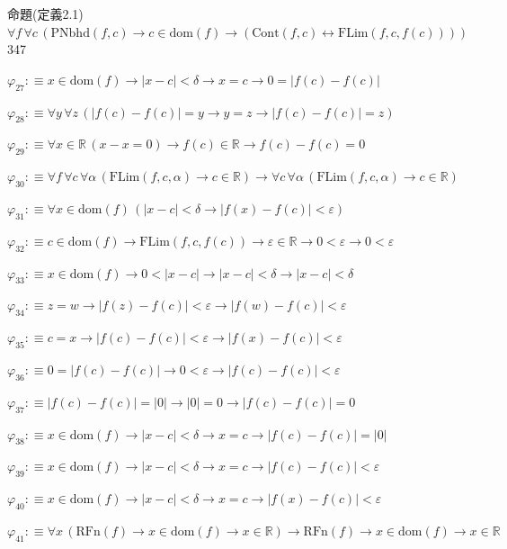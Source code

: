 \begin{fullproof}{命題(定義2.1)}{$\forall f\,\forall c\,(\mathrm{PNbhd}(f,c) \to c \in \mathrm{dom}(f) \to (\mathrm{Cont}(f,c) \leftrightarrow \mathrm{FLim}(f,c,f(c))))$}{347}
\begin{abbrevlist}
\item $\varphi_{27} :\equiv x \in \mathrm{dom}(f) \to \lvert x - c \rvert < \delta \to x = c \to 0 = \lvert f(c) - f(c) \rvert$
\item $\varphi_{28} :\equiv \forall y\,\forall z\,(\lvert f(c) - f(c) \rvert = y \to y = z \to \lvert f(c) - f(c) \rvert = z)$
\item $\varphi_{29} :\equiv \forall x \in \mathbb{R}\,(x - x = 0) \to f(c) \in \mathbb{R} \to f(c) - f(c) = 0$
\item $\varphi_{30} :\equiv \forall f\,\forall c\,\forall \alpha\,(\mathrm{FLim}(f,c,\alpha) \to c \in \mathbb{R}) \to \forall c\,\forall \alpha\,(\mathrm{FLim}(f,c,\alpha) \to c \in \mathbb{R})$
\item $\varphi_{31} :\equiv \forall x \in \mathrm{dom}(f)\,(\lvert x - c \rvert < \delta \to \lvert f(x) - f(c) \rvert < \varepsilon)$
\item $\varphi_{32} :\equiv c \in \mathrm{dom}(f) \to \mathrm{FLim}(f,c,f(c)) \to \varepsilon \in \mathbb{R} \to 0 < \varepsilon \to 0 < \varepsilon$
\item $\varphi_{33} :\equiv x \in \mathrm{dom}(f) \to 0 < \lvert x - c \rvert \to \lvert x - c \rvert < \delta \to \lvert x - c \rvert < \delta$
\item $\varphi_{34} :\equiv z = w \to \lvert f(z) - f(c) \rvert < \varepsilon \to \lvert f(w) - f(c) \rvert < \varepsilon$
\item $\varphi_{35} :\equiv c = x \to \lvert f(c) - f(c) \rvert < \varepsilon \to \lvert f(x) - f(c) \rvert < \varepsilon$
\item $\varphi_{36} :\equiv 0 = \lvert f(c) - f(c) \rvert \to 0 < \varepsilon \to \lvert f(c) - f(c) \rvert < \varepsilon$
\item $\varphi_{37} :\equiv \lvert f(c) - f(c) \rvert = \lvert 0 \rvert \to \lvert 0 \rvert = 0 \to \lvert f(c) - f(c) \rvert = 0$
\item $\varphi_{38} :\equiv x \in \mathrm{dom}(f) \to \lvert x - c \rvert < \delta \to x = c \to \lvert f(c) - f(c) \rvert = \lvert 0 \rvert$
\item $\varphi_{39} :\equiv x \in \mathrm{dom}(f) \to \lvert x - c \rvert < \delta \to x = c \to \lvert f(c) - f(c) \rvert < \varepsilon$
\item $\varphi_{40} :\equiv x \in \mathrm{dom}(f) \to \lvert x - c \rvert < \delta \to x = c \to \lvert f(x) - f(c) \rvert < \varepsilon$
\item $\varphi_{41} :\equiv \forall x\,(\mathrm{RFn}(f) \to x \in \mathrm{dom}(f) \to x \in \mathbb{R}) \to \mathrm{RFn}(f) \to x \in \mathrm{dom}(f) \to x \in \mathbb{R}$

\end{abbrevlist}
\end{fullproof}
